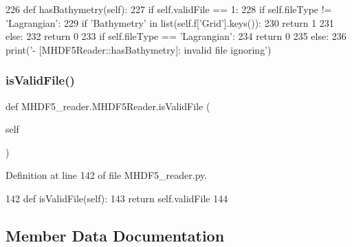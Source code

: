\begin{DoxyCode}
226     \textcolor{keyword}{def }hasBathymetry(self):
227         \textcolor{keywordflow}{if} self.validFile == 1:            
228             \textcolor{keywordflow}{if} self.fileType != \textcolor{stringliteral}{'Lagrangian'}:
229                 \textcolor{keywordflow}{if} \textcolor{stringliteral}{'Bathymetry'} \textcolor{keywordflow}{in} list(self.f[\textcolor{stringliteral}{'Grid'}].keys()):
230                     \textcolor{keywordflow}{return} 1
231                 \textcolor{keywordflow}{else}:
232                     \textcolor{keywordflow}{return} 0
233             \textcolor{keywordflow}{if} self.fileType == \textcolor{stringliteral}{'Lagrangian'}:
234                 \textcolor{keywordflow}{return} 0
235         \textcolor{keywordflow}{else}:
236             print(\textcolor{stringliteral}{'- [MHDF5Reader::hasBathymetry]: invalid file ignoring'})
\end{DoxyCode}
\mbox{\label{class_m_h_d_f5__reader_1_1_m_h_d_f5_reader_a6f95078ac94bea3283223688091854d5}} 
\subsubsection{\texorpdfstring{is\+Valid\+File()}{isValidFile()}}
{\footnotesize\ttfamily def M\+H\+D\+F5\+\_\+reader.\+M\+H\+D\+F5\+Reader.\+is\+Valid\+File (\begin{DoxyParamCaption}\item[{}]{self }\end{DoxyParamCaption})}



Definition at line 142 of file M\+H\+D\+F5\+\_\+reader.\+py.


\begin{DoxyCode}
142     \textcolor{keyword}{def }isValidFile(self):
143         \textcolor{keywordflow}{return} self.validFile
144                 
\end{DoxyCode}


\subsection{Member Data Documentation}
\mbox{\label{class_m_h_d_f5__reader_1_1_m_h_d_f5_reader_abb791fb16427504bfe7dfa73204747e9}} 
